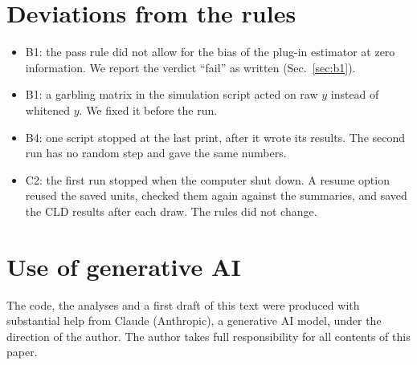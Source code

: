 \documentclass[11pt]{article}
\begin{document}
\section*{Deviations from the rules}
\begin{itemize}
\item B1: the pass rule did not allow for the bias of the plug-in estimator at zero information. We report the
verdict ``fail'' as written (Sec.~\ref{sec:b1}).
\item B1: a garbling matrix in the simulation script acted on raw $y$ instead of whitened $y$. We fixed it before the
run.
\item B4: one script stopped at the last print, after it wrote its results. The second run has no random step and gave
the same numbers.
\item C2: the first run stopped when the computer shut down. A resume option reused the saved units, checked them again
against the summaries, and saved the CLD results after each draw. The rules did not change.
\end{itemize}

\section*{Use of generative AI}
The code, the analyses and a first draft of this text were produced with substantial help from Claude (Anthropic), a
generative AI model, under the direction of the author. The author takes full responsibility for all contents of this
paper.



\end{document}
